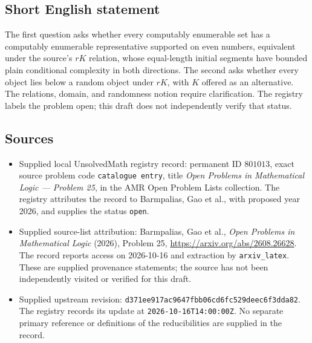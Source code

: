 \documentclass[11pt]{article}
\begin{document}
\subsection{Short English statement}
The first question asks whether every computably enumerable set has a computably enumerable representative supported on even numbers, equivalent under the source's \(rK\) relation, whose equal-length initial segments have bounded plain conditional complexity in both directions. The second asks whether every object lies below a random object under \(rK\), with \(K\) offered as an alternative. The relations, domain, and randomness notion require clarification. The registry labels the problem open; this draft does not independently verify that status.
\subsection{Sources}
\begin{itemize}
\item Supplied local UnsolvedMath registry record: permanent ID \(801013\), exact source problem code \texttt{catalogue entry}, title \emph{Open Problems in Mathematical Logic --- Problem 25}, in the AMR Open Problem Lists collection. The registry attributes the record to Barmpalias, Gao et al., with proposed year 2026, and supplies the status \texttt{open}.
\item Supplied source-list attribution: Barmpalias, Gao et al., \emph{Open Problems in Mathematical Logic} (2026), Problem 25, \url{https://arxiv.org/abs/2608.26628}. The record reports access on 2026-10-16 and extraction by \texttt{arxiv\_latex}. These are supplied provenance statements; the source has not been independently visited or verified for this draft.
\item Supplied upstream revision: \texttt{d371ee917ac9647fbb06cd6fc529deec6f3dda82}. The registry records its update at \texttt{2026-10-16T14:00:00Z}. No separate primary reference or definitions of the reducibilities are supplied in the record.
\end{itemize}
\end{document}

